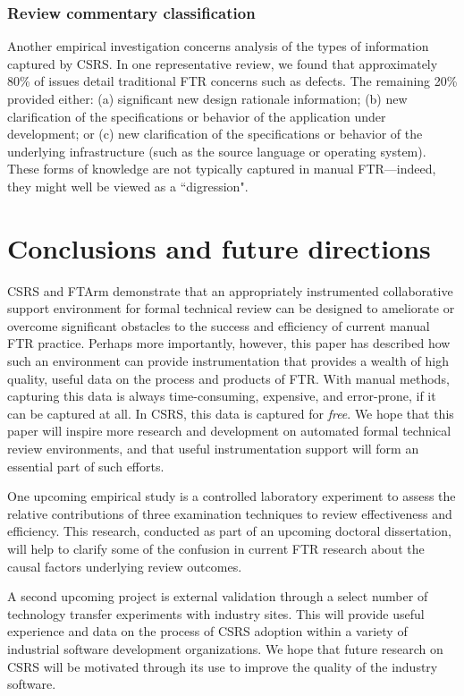 \subsubsection{Review commentary classification}

Another empirical investigation concerns analysis of the types of
information captured by CSRS.  In one representative review, we found that
approximately 80\% of issues detail traditional FTR concerns such as
defects. The remaining 20\% provided either: (a) significant new design
rationale information; (b) new clarification of the specifications or
behavior of the application under development; or (c) new clarification of
the specifications or behavior of the underlying infrastructure (such as
the source language or operating system).  These forms of knowledge are not
typically captured in manual FTR---indeed, they might well be viewed as a
``digression".


\section{Conclusions and future directions}

CSRS and FTArm demonstrate that an appropriately instrumented collaborative
support environment for formal technical review can be designed to
ameliorate or overcome significant obstacles to the success and efficiency
of current manual FTR practice.  Perhaps more importantly, however, this
paper has described how such an environment can provide instrumentation
that provides a wealth of high quality, useful data on the process and
products of FTR.  With manual methods, capturing this data is always
time-consuming, expensive, and error-prone, if it can be captured at all.
In CSRS, this data is captured for {\em free}.  We hope that this paper
will inspire more research and development on automated formal technical
review environments, and that useful instrumentation support will form an
essential part of such efforts.

One upcoming empirical study is a controlled laboratory experiment to
assess the relative contributions of three examination techniques to review
effectiveness and efficiency.  This research, conducted as part of an
upcoming doctoral dissertation, will help to clarify some of the
confusion in current FTR research about the causal factors underlying
review outcomes.

A second upcoming project is external validation through a select number of
technology transfer experiments with industry sites.  This will provide
useful experience and data on the process of CSRS adoption within a variety
of industrial software development organizations.  We hope that future
research on CSRS will be motivated through its use to improve the quality
of the industry software. 



